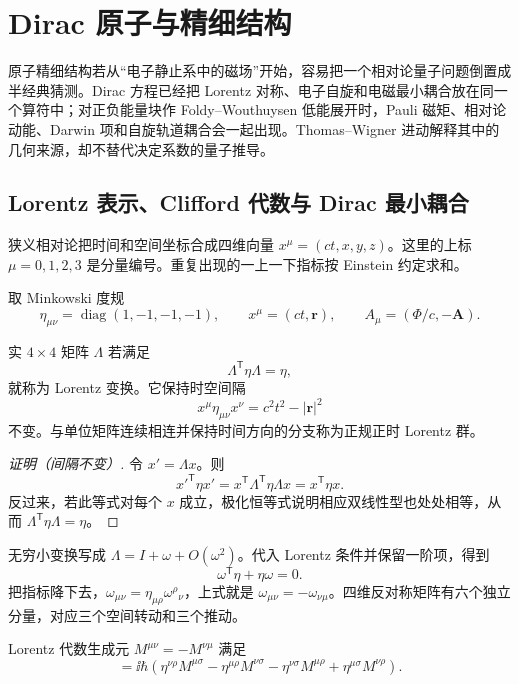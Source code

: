 \section{Dirac 原子与精细结构}
\label{ch:spin-orbit-thomas}

原子精细结构若从“电子静止系中的磁场”开始，容易把一个相对论量子问题倒置成半经典猜测。Dirac 方程已经把 Lorentz 对称、电子自旋和电磁最小耦合放在同一个算符中；对正负能量块作 Foldy--Wouthuysen 低能展开时，Pauli 磁矩、相对论动能、Darwin 项和自旋轨道耦合会一起出现。Thomas--Wigner 进动解释其中的几何来源，却不替代决定系数的量子推导。
\subsection{Lorentz 表示、Clifford 代数与 Dirac 最小耦合}\label{sec:dirac-lorentz}

狭义相对论把时间和空间坐标合成四维向量
\(x^\mu=(ct,x,y,z)\)。这里的上标 \(\mu=0,1,2,3\) 是分量编号。重复出现的一上一下指标按 Einstein 约定求和。

取 Minkowski 度规
\[
\eta_{\mu\nu}=\operatorname{diag}(1,-1,-1,-1),
\qquad
x^\mu=(ct,\mathbf r),
\qquad
A_\mu=(\Phi/c,-\mathbf A).
\]

\begin{definition}[Lorentz 变换]
实 \(4\times4\) 矩阵 \(\Lambda\) 若满足
\[
\Lambda^{\mathsf T}\eta\Lambda=\eta,
\]
就称为 Lorentz 变换。它保持时空间隔
\[
x^\mu\eta_{\mu\nu}x^\nu=c^2t^2-|\mathbf r|^2
\]
不变。与单位矩阵连续相连并保持时间方向的分支称为正规正时 Lorentz 群。
\end{definition}

\begin{proof}[证明（间隔不变）]
令 \(x'=\Lambda x\)。则
\[
x'^{\mathsf T}\eta x'
=x^{\mathsf T}\Lambda^{\mathsf T}\eta\Lambda x
=x^{\mathsf T}\eta x.
\]
反过来，若此等式对每个 \(x\) 成立，极化恒等式说明相应双线性型也处处相等，从而
\(\Lambda^{\mathsf T}\eta\Lambda=\eta\)。
\end{proof}

无穷小变换写成
\(\Lambda=I+\omega+O(\omega^2)\)。代入 Lorentz 条件并保留一阶项，得到
\[
\omega^{\mathsf T}\eta+\eta\omega=0.
\]
把指标降下去，\(\omega_{\mu\nu}=\eta_{\mu\rho}\omega^\rho{}_\nu\)，上式就是
\(\omega_{\mu\nu}=-\omega_{\nu\mu}\)。四维反对称矩阵有六个独立分量，对应三个空间转动和三个推动。

Lorentz 代数生成元 $M^{\mu\nu}=-M^{\nu\mu}$ 满足
\begin{equation}
[M^{\mu\nu},M^{\rho\sigma}]
=\ii\hbar
\left(
\eta^{\nu\rho}M^{\mu\sigma}
-\eta^{\mu\rho}M^{\nu\sigma}
-\eta^{\nu\sigma}M^{\mu\rho}
+\eta^{\mu\sigma}M^{\nu\rho}
\right).
\label{eq:rel-lorentz-algebra}
\end{equation}

